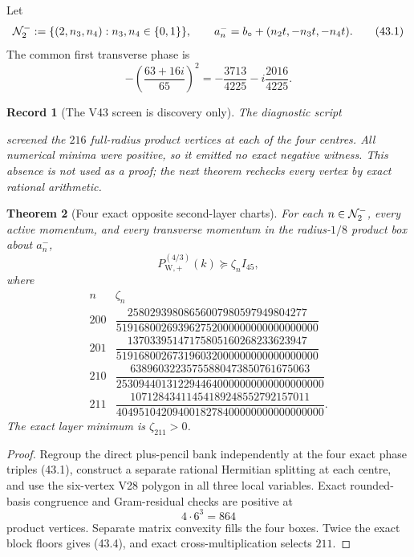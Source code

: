 \documentclass[11pt,oneside]{article}
\newtheorem{theorem}{Theorem}[section]
\newtheorem{record}[theorem]{Record}
\theoremstyle{definition}
\theoremstyle{remark}
\begin{document}
Let
\[
 {\cal N}_{2}^{-}:=\{(2,n_3,n_4):n_3,n_4\in\{0,1\}\},
\qquad
 a_n^-=b_\circ+(n_2t,-n_3t,-n_4t).                   \tag{43.1}
\]
The common first transverse phase is
\[
 -\left(\frac{63+16i}{65}\right)^2
 =-\frac{3713}{4225}-i\frac{2016}{4225}.              \tag{43.2}
\]

\begin{record}[The V43 screen is discovery only]
\label{rec:newv43-screen}
The diagnostic script
\begin{center}
\footnotesize
{}
\end{center}
screened the \(216\) full-radius product vertices at each of the
four centres.  All numerical minima were positive, so it emitted no
exact negative witness.  This absence is not used as a proof; the
next theorem rechecks every vertex by exact rational arithmetic.
\end{record}

\begin{theorem}[Four exact opposite second-layer charts]
\label{thm:newv43-four-charts}
For each \(n\in{\cal N}_2^-\), every active momentum, and every
transverse momentum in the radius-\(1/8\) product box about \(a_n^-\),
\[
 P_{\mathrm W,+}^{(4/3)}(k)\succeq\zeta_n I_{45},      \tag{43.3}
\]
where
\[
\begin{array}{c|c}
n&\zeta_n\\ \hline
200&\dfrac{25802939808656007980597949804277}
{519168002693962752000000000000000000}\\[5pt]
201&\dfrac{13703395147175805160268233623947}
{519168002673196032000000000000000000}\\[5pt]
210&\dfrac{63896032235755880473850761675063}
{2530944013122944640000000000000000000}\\[5pt]
211&\dfrac{10712843411454189248552792157011}
{4049510420940018278400000000000000000}.
\end{array}                                             \tag{43.4}
\]
The exact layer minimum is \(\zeta_{211}>0\).
\end{theorem}

\begin{proof}
Regroup the direct plus-pencil bank independently at the four exact
phase triples (43.1), construct a separate rational Hermitian
splitting at each centre, and use the six-vertex V28 polygon in all
three local variables.  Exact rounded-basis congruence and
Gram-residual checks are positive at
\[
 4\cdot6^3=864                                         \tag{43.5}
\]
product vertices.  Separate matrix convexity fills the four boxes.
Twice the exact block floors gives (43.4), and exact
cross-multiplication selects \(211\).
\end{proof}
\end{document}
